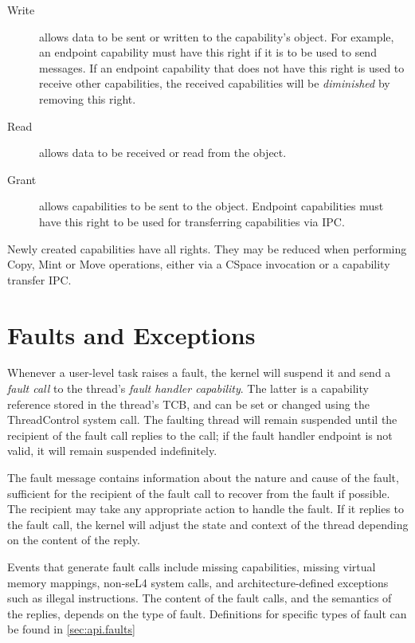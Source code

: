 \begin{description}
\item[Write] allows data to be sent or written to the capability's object. For
example, an endpoint capability must have this right if it is to be used to
send messages. If an endpoint capability that does not have this right is used to receive other capabilities, the received capabilities will be \emph{diminished} by removing this right.

\item[Read] allows data to be received or read from the object.

\item[Grant] allows capabilities to be sent to the object. Endpoint capabilities must have this right to be used for transferring capabilities via IPC.
\end{description}

Newly created capabilities have all rights. They may be reduced when performing
Copy, Mint or Move operations, either via a CSpace invocation or a capability
transfer IPC. 

\section[faults]{Faults and Exceptions}

Whenever a user-level task raises a fault, the kernel will suspend
it and send a \emph{fault call} to the thread's \emph{fault handler
capability}. The latter is a capability reference stored in the thread's TCB,
and can be set or changed using the ThreadControl system call. The faulting thread will remain suspended until the recipient of the fault call replies to the call; if the fault handler endpoint is not valid, it will remain suspended indefinitely.

The fault message contains information about the nature and cause of the
fault, sufficient for the recipient of the fault call to recover from the
fault if possible. The recipient may take any appropriate action to handle the fault. If it replies to the fault call, the kernel will adjust the state and context of the thread depending on the content of the reply.

Events that generate fault calls include missing capabilities, missing virtual memory mappings, non-seL4 system calls, and architecture-defined exceptions such as illegal instructions. The content of the fault calls, and the semantics of the replies, depends on the type of fault. Definitions for specific types of fault can be found in \autoref{sec:api.faults}

